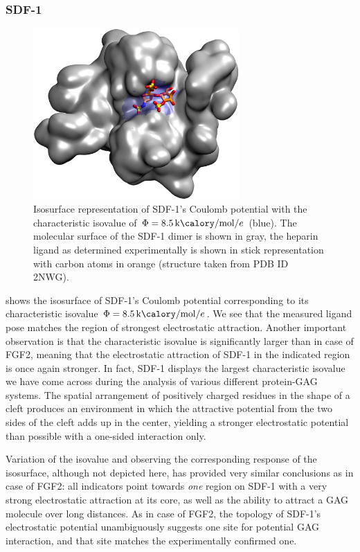 \subsubsection{SDF-1}

\begin{figure}
\centering
\includegraphics[width=0.7\textwidth]{gfx/bspred/sdf1_isopot_8_5_view1_rotated_jcc_pub_001.jpg}
\caption[]{
Isosurface representation of SDF-1's Coulomb potential with the characteristic
isovalue of $\Phi=\SI{8.5}{\kilo\calory\per\mole\per\elementarycharge}$ (blue).
The molecular surface of the SDF-1 dimer is shown in gray, the heparin ligand as
determined experimentally is shown in stick representation with carbon atoms in
orange (structure taken from PDB ID 2NWG).}
\label{fig:bspred:sdf1_estatic}
\end{figure}

 shows the isosurface of SDF-1's Coulomb potential
corresponding to its characteristic isovalue
$\Phi=\SI{8.5}{\kilo\calory\per\mole\per\elementarycharge}$. We see that the
measured ligand pose matches the region of strongest electrostatic attraction.
Another important observation is that the characteristic isovalue is
significantly larger than in case of FGF2, meaning that the electrostatic
attraction of SDF-1 in the indicated region is once again stronger. In fact,
SDF-1 displays the largest characteristic isovalue we have come across during
the analysis of various different protein-GAG systems. The spatial arrangement
of positively charged residues in the shape of a cleft produces an environment
in which the attractive potential from the two sides of the cleft adds up in the
center, yielding a stronger electrostatic potential than possible with a
one-sided interaction only.

Variation of the isovalue and observing the corresponding response of the
isosurface, although not depicted here, has provided very similar conclusions as
in case of FGF2: all indicators point towards \textit{one} region on SDF-1 with
a very strong electrostatic attraction at its core, as well as the ability to
attract a GAG molecule over long distances. As in case of FGF2, the topology of
SDF-1's electrostatic potential unambiguously suggests one site for potential
GAG interaction, and that site matches the experimentally confirmed one.


